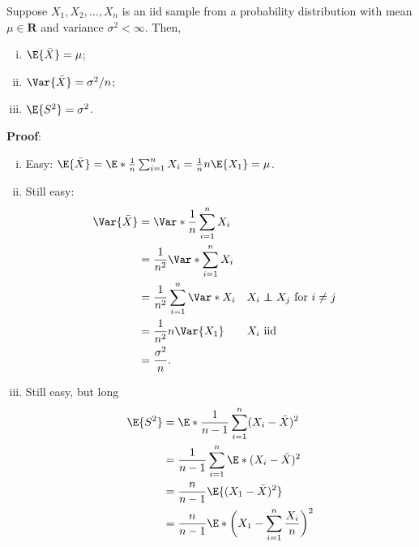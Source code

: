 \begin{Theorem}{}{}
    Suppose $ X_1,X_2,\ldots,X_n $ is an iid sample from a probability distribution with mean
    $ \mu\in\mathbf{R} $ and variance $ \sigma^2<\infty $. Then,
    \begin{enumerate}[(i)]
        \item $ \E{\bar{X}}=\mu $;
        \item $ \Var{\bar{X}}=\sigma^2/n $;
        \item $ \E{S^2}=\sigma^2 $.
    \end{enumerate}
    \tcblower{}
    \textbf{Proof}:
    \begin{enumerate}[(i)]
        \item Easy: $ \E{\bar{X}}=\E*{\frac{1}{n}\sum_{i=1}^{n}X_i}=\frac{1}{n}n\E{X_1}=\mu $.
        \item Still easy:
              \begin{align*}
                  \Var{\bar{X}}
                   & =\Var*{\frac{1}{n}\sum_{i=1}^{n}X_i}                                            \\
                   & =\frac{1}{n^2}\Var*{\sum_{i=1}^{n}X_i}                                          \\
                   & =\frac{1}{n^2}\sum_{i=1}^{n}\Var*{X_i} &  & \text{$X_i\indep X_j$ for $i\ne j$} \\
                   & =\frac{1}{n^2}n\Var{X_1}               &  & \text{$X_i$ iid}                    \\
                   & =\frac{\sigma^2}{n}.
              \end{align*}
        \item Still easy, but long
              \begin{align*}
                  \E{S^2}
                   & =\E*{\frac{1}{n-1}\sum_{i=1}^{n}(X_i-\bar{X})^2}                                                                                                        \\
                   & =\frac{1}{n-1}\sum_{i=1}^{n}\E*{(X_i-\bar{X})^2}                                                                                                        \\
                   & =\frac{n}{n-1}\E{(X_1-\bar{X})^2}                                                                                                                       \\
                   & =\frac{n}{n-1}\E*{\biggl(X_1-\sum_{i=1}^{n}\frac{X_i}{n}\biggr)^2}                                                                                      \\

\end{align*}
\end{enumerate}
\end{Theorem}
